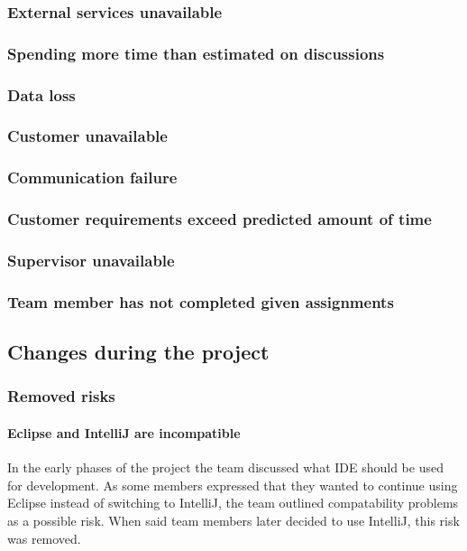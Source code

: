 \subsubsection{External services unavailable}
\subsubsection{Spending more time than estimated on discussions}
\subsubsection{Data loss}
\subsubsection{Customer unavailable}
\subsubsection{Communication failure}
\subsubsection{Customer requirements exceed predicted amount of time}
\subsubsection{Supervisor unavailable}
\subsubsection{Team member has not completed given assignments}


\subsection{Changes during the project}
\subsubsection{Removed risks}
\paragraph{Eclipse and IntelliJ are incompatible}
In the early phases of the project the team discussed what IDE should be used for development. As some members expressed that they wanted to continue using Eclipse instead of switching to IntelliJ, the team outlined compatability problems as a possible risk. When said team members later decided to use IntelliJ, this risk was removed.

